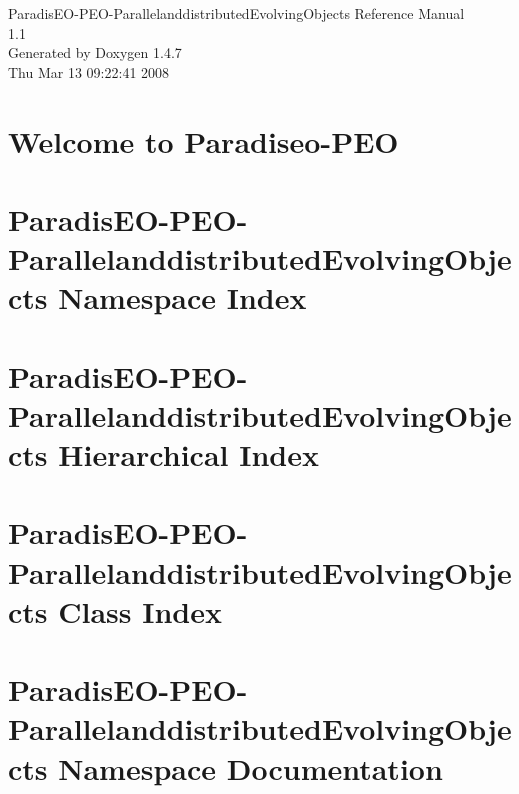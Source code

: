 \documentclass[a4paper]{book}
\begin{document}
\begin{titlepage}
\vspace*{7cm}
\begin{center}
{\Large Paradis\-EO-PEO-Parallelanddistributed\-Evolving\-Objects Reference Manual\\[1ex]\large 1.1 }\\
\vspace*{1cm}
{\large Generated by Doxygen 1.4.7}\\
\vspace*{0.5cm}
{\small Thu Mar 13 09:22:41 2008}\\
\end{center}
\end{titlepage}
\clearemptydoublepage
{}
\tableofcontents
\clearemptydoublepage
{}
\chapter{Welcome to Paradiseo-PEO }
\label{index}\hypertarget{index}{}
\chapter{Paradis\-EO-PEO-Parallelanddistributed\-Evolving\-Objects Namespace Index}

\chapter{Paradis\-EO-PEO-Parallelanddistributed\-Evolving\-Objects Hierarchical Index}

\chapter{Paradis\-EO-PEO-Parallelanddistributed\-Evolving\-Objects Class Index}

\chapter{Paradis\-EO-PEO-Parallelanddistributed\-Evolving\-Objects Namespace Documentation}

\end{document}
